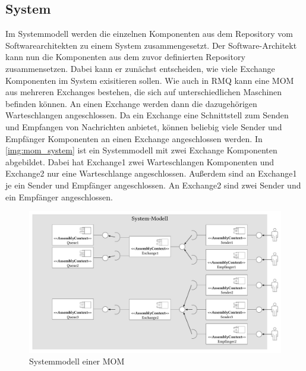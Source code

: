 \subsection{System}
Im Systemmodell werden die einzelnen Komponenten aus dem Repository vom Softwarearchitekten zu einem System zusammengesetzt. Der Software-Architekt kann nun die Komponenten aus dem zuvor definierten Repository zusammensetzen. Dabei kann er zunächst entscheiden, wie viele Exchange Komponenten im System exisitieren sollen. Wie auch in RMQ kann eine MOM aus mehreren Exchanges bestehen, die sich auf unterschiedlichen Maschinen befinden können. An einen Exchange werden dann die dazugehörigen Warteschlangen angeschlossen. Da ein Exchange eine Schnittstell zum Senden und Empfangen von Nachrichten anbietet, können beliebig viele Sender und Empfänger Komponenten an einen Exchange angeschlossen werden. In \autoref{img:mom_system} ist ein Systemmodell mit zwei Exchange Komponenten abgebildet. Dabei hat Exchange1 zwei Warteschlangen Komponenten und Exchange2 nur eine Warteschlange angeschlossen. Außerdem sind an Exchange1 je ein Sender und Empfänger angeschlossen. An Exchange2 sind zwei Sender und ein Empfänger angeschlossen. 

\begin{figure}
\center
  \includegraphics[width=1\textwidth]{images/modelling/systemModell.pdf}
  \caption{Systemmodell einer MOM}
  \label{img:mom_system}
\end{figure}
